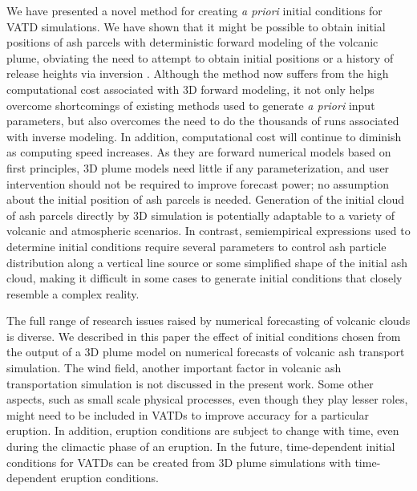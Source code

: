 \documentclass[draft,linenumbers]{agujournal2019}
\begin{document}
We have presented a novel method for creating \textit{a priori} initial conditions for VATD simulations. We have shown that it might be possible to obtain initial positions of ash parcels with deterministic forward modeling of the volcanic plume, obviating the need to attempt to obtain initial positions or a history of release heights via inversion \citep{stohl2011determination}. Although the method now suffers from the high computational cost associated with 3D forward modeling, it not only helps overcome shortcomings of existing methods used to generate \textit{a priori} input parameters, but also overcomes the need to do the thousands of runs associated with inverse modeling.  In addition, computational cost will continue to diminish as computing speed increases.  As they are forward numerical models based on first principles, 3D plume models need little if any parameterization, and user intervention should not be required to improve forecast power; no assumption about the initial position of ash parcels is needed. Generation of the initial cloud of ash parcels directly by 3D simulation is potentially adaptable to a variety of volcanic and atmospheric scenarios.  In contrast, semiempirical expressions used to determine initial conditions require several parameters to control ash particle distribution along a vertical line source or some simplified shape of the initial ash cloud, making it difficult in some cases to generate initial conditions that closely resemble a complex reality.

The full range of research issues raised by numerical forecasting of volcanic clouds is diverse. We described in this paper the effect of initial conditions chosen from the output of a 3D plume model on numerical forecasts of volcanic ash transport simulation.  The wind field, another important factor in volcanic ash transportation simulation is not discussed in the present work. Some other aspects, such as small scale physical processes, even though they play lesser roles, might need to be included in VATDs to improve accuracy for a particular eruption. In addition, eruption conditions are subject to change with time, even during the climactic phase of an eruption.  In the future, time-dependent initial conditions for VATDs can be created from 3D plume simulations with time-dependent eruption conditions.



\end{document}
